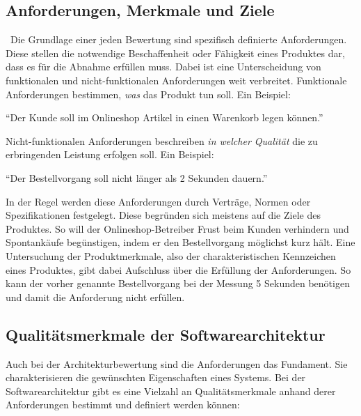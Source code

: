 \subsection{Anforderungen, Merkmale und Ziele}
\
Die Grundlage einer jeden Bewertung sind spezifisch definierte Anforderungen. Diese stellen die notwendige Beschaffenheit oder Fähigkeit eines Produktes dar, dass es für die Abnahme erfüllen muss. Dabei ist eine Unterscheidung von funktionalen und nicht-funktionalen Anforderungen weit verbreitet. Funktionale Anforderungen bestimmen, \textit{was} das Produkt tun soll\cite{Robertson2006}. Ein Beispiel:

\enquote{Der Kunde soll im Onlineshop Artikel in einen Warenkorb legen können.}

Nicht-funktionalen Anforderungen beschreiben \textit{in welcher Qualität} die zu erbringenden Leistung erfolgen soll\cite{Robertson2006}. Ein Beispiel:

\enquote{Der Bestellvorgang soll nicht länger als 2 Sekunden dauern.}

In der Regel werden diese Anforderungen durch Verträge, Normen oder Spezifikationen festgelegt. Diese begründen sich meistens auf die Ziele des Produktes. So will der Onlineshop-Betreiber Frust beim Kunden verhindern und Spontankäufe begünstigen, indem er den Bestellvorgang möglichst kurz hält.
Eine Untersuchung der Produktmerkmale, also der charakteristischen Kennzeichen eines Produktes, gibt dabei Aufschluss über die Erfüllung der Anforderungen. So kann der vorher genannte Bestellvorgang bei der Messung 5 Sekunden benötigen und damit die Anforderung nicht erfüllen.      

\subsection{Qualitätsmerkmale der Softwarearchitektur}

Auch bei der Architekturbewertung sind die Anforderungen das Fundament. Sie charakterisieren die 
gewünschten Eigenschaften eines Systems\cite{Starke2015}.
Bei der Softwarearchitektur gibt es eine Vielzahl an Qualitätsmerkmale anhand derer Anforderungen bestimmt und definiert werden können\cites{Starke2015}{Clements2000}:

